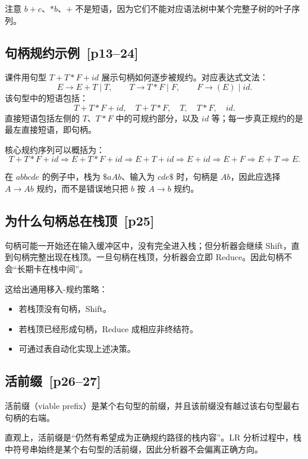 \documentclass[UTF8,fontset=none,11pt]{ctexart}
\newenvironment{defbox}[1][]{%
  \par\medskip\noindent{\color{defrule}\rule{\linewidth}{1.1pt}}\par\nopagebreak
  \noindent{\bfseries\color{defrule}#1}\par\nopagebreak\smallskip}%
  {\par\nopagebreak\smallskip\noindent{\color{defrule}\rule{\linewidth}{0.4pt}}\par\medskip}
\newcommand{\pg}[1]{\texorpdfstring{{\small\color{graytext}\,[p#1]}}{ [p#1]}}
\begin{document}
注意 \(b+c\)、\(*b\)、\(+\) 不是短语，因为它们不能对应语法树中某个完整子树的叶子序列。

\subsection{句柄规约示例 \pg{13--24}}

课件用句型 \(T+T*F+id\) 展示句柄如何逐步被规约。对应表达式文法：
\[
E\to E+T\mid T,\qquad T\to T*F\mid F,\qquad F\to (E)\mid id.
\]
该句型中的短语包括：
\[
T+T*F+id,\quad T+T*F,\quad T,\quad T*F,\quad id.
\]
直接短语包括左侧的 \(T\)、\(T*F\) 中的可规约部分，以及 \(id\) 等；每一步真正规约的是最左直接短语，即句柄。

核心规约序列可以概括为：
\[
T+T*F+id
\Rightarrow E+T*F+id
\Rightarrow E+T+id
\Rightarrow E+id
\Rightarrow E+F
\Rightarrow E+T
\Rightarrow E.
\]

在 \(abbcde\) 的例子中，栈为 \(\$aAb\)、输入为 \(cde\$\) 时，句柄是 \(Ab\)，因此应选择 \(A\to Ab\) 规约，而不是错误地只把 \(b\) 按 \(A\to b\) 规约。

\subsection{为什么句柄总在栈顶 \pg{25}}

句柄可能一开始还在输入缓冲区中，没有完全进入栈；但分析器会继续 Shift，直到句柄完整出现在栈顶。一旦句柄在栈顶，分析器会立即 Reduce。因此句柄不会“长期卡在栈中间”。

这给出通用移入-规约策略：

\begin{itemize}
  \item 若栈顶没有句柄，Shift。
  \item 若栈顶已经形成句柄，Reduce 成相应非终结符。
  \item 可通过表自动化实现上述决策。
\end{itemize}

\subsection{活前缀 \pg{26--27}}

\begin{defbox}[活前缀]
活前缀（viable prefix）是某个右句型的前缀，并且该前缀没有越过该右句型最右句柄的右端。
\end{defbox}

直观上，活前缀是“仍然有希望成为正确规约路径的栈内容”。LR 分析过程中，栈中符号串始终是某个右句型的活前缀，因此分析器不会偏离正确方向。
\end{document}
